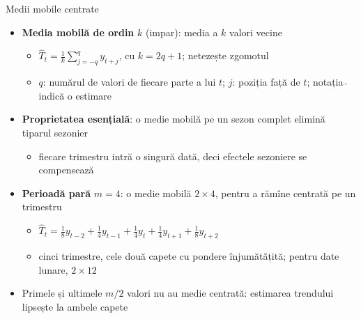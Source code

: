 \begin{frame}{Medii mobile centrate}
\itemsize{\small}
\begin{itemize}
    \item \textbf{Media mobilă de ordin} $k$ (impar): media a $k$ valori vecine
    \begin{itemize}
        \item $\hat T_t = \frac{1}{k} \sum_{j=-q}^{q} y_{t+j}$, cu $k = 2q + 1$; netezește zgomotul
        \item $q$: numărul de valori de fiecare parte a lui $t$; $j$: poziția față de $t$; notația $\hat{\ }$ indică o estimare
    \end{itemize}
    \item \textbf{Proprietatea esențială}: o medie mobilă pe un sezon complet elimină tiparul sezonier
    \begin{itemize}
        \item fiecare trimestru intră o singură dată, deci efectele sezoniere se compensează
    \end{itemize}
    \item \textbf{Perioadă pară} $m = 4$: o medie mobilă $2 \times 4$, pentru a rămîne centrată pe un trimestru
    \begin{itemize}
        \item $\hat T_t = \frac{1}{8} y_{t-2} + \frac{1}{4} y_{t-1} + \frac{1}{4} y_t + \frac{1}{4} y_{t+1} + \frac{1}{8} y_{t+2}$
        \item cinci trimestre, cele două capete cu pondere înjumătățită; pentru date lunare, $2 \times 12$
    \end{itemize}
    \item Primele și ultimele $m/2$ valori nu au medie centrată: estimarea trendului lipsește la ambele capete
\end{itemize}
\end{frame}

